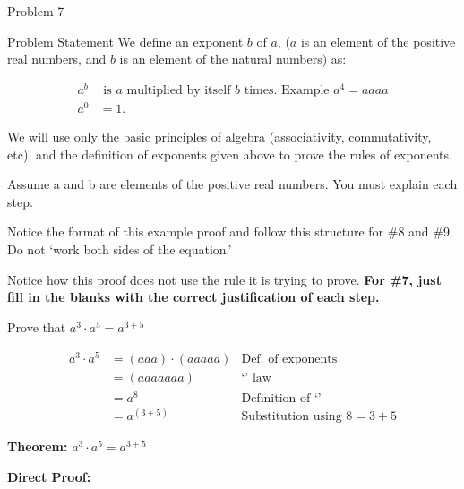 \begin{problem}{Problem 7}
    \begin{statement}{Problem Statement}
        We define an exponent $b$ of $a$, ($a$ is an element of the positive real numbers, and $b$ is an element of the natural numbers) as:

        \begin{align*}
            a^{b} & \text{ is } a \text{ multiplied by itself } b \text{ times. Example } a^{4} = aaaa \\
            a^{0} & = 1.
        \end{align*}

        We will use only the basic principles of algebra (associativity, commutativity, etc), and the definition of exponents given above to prove the rules of exponents. \vspace*{1em}

        Assume a and b are elements of the positive real numbers. You must explain each step. \vspace*{1em}

        Notice the format of this example proof and follow this structure for \#8 and \#9. Do not `work both sides of the equation.' \vspace*{1em}

        Notice how this proof does not use the rule it is trying to prove. \textbf{For \#7, just fill in the blanks with the correct justification of each step.} \vspace*{1em}

        Prove that $a^{3} \cdot a^{5} = a^{3+5}$ \vspace*{1em}

        \begin{align*}
            a^{3} \cdot a^{5} & = (aaa) \cdot (aaaaa) & \text{Def. of exponents} \\
            & = (aaaaaaa) & \text{`' law} \\
            & = a^{8} & \text{Definition of `'} \\
            & = a^{(3 + 5)} & \text{Substitution using } 8 = 3 + 5
        \end{align*}
    \end{statement}

    \begin{highlight}[Solution]
        \textbf{Theorem:} $a^{3}\cdot a^{5} = a^{3 + 5}$ \vspace*{1em}

        \textbf{Direct Proof:} \vspace*{1em}


\end{highlight}
\end{problem}
